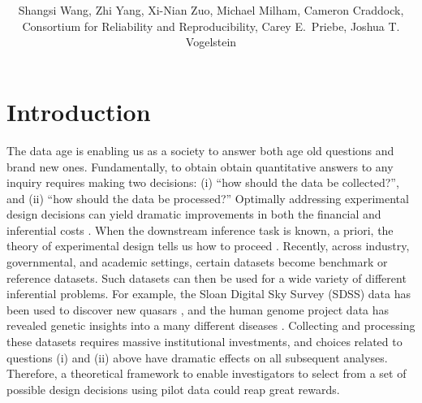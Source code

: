 \documentclass{article}
\title{\vspace{-50pt}
\db{Optimal Design for Discovery Science: \\ Applications in Neuroimaging}
}
\author{Shangsi Wang, Zhi Yang, Xi-Nian Zuo, Michael Milham, Cameron Craddock,  \\ Consortium for Reliability and Reproducibility, Carey E.~Priebe, Joshua T. Vogelstein}
\begin{document}
\maketitle

\section{Introduction}

The data age is enabling us as a society to answer both age old questions and brand new ones.  Fundamentally, to obtain obtain quantitative answers to any inquiry requires making two decisions: (i) ``how should the data be collected?'', and (ii) ``how should the data be processed?''  Optimally addressing experimental design decisions can yield dramatic improvements in both the financial and inferential costs \cite{?}.  When the downstream inference task is known, a priori, the theory of experimental design tells us how to proceed \cite{Fisher1935}. 
% 
Recently, across industry, governmental, and academic settings, certain datasets become benchmark or reference datasets.  Such datasets can then be used for a wide variety of different inferential problems. For example, the Sloan Digital Sky Survey (SDSS) data has been used to discover new quasars \cite{?}, and the human genome project data has revealed genetic insights into a many different diseases \cite{?}.  Collecting and processing these datasets requires massive institutional investments, and choices related to questions (i) and (ii) above have dramatic effects on all subsequent analyses.  Therefore, a theoretical framework to enable investigators to select from a set of possible design decisions using pilot data could reap great rewards.
\end{document}
